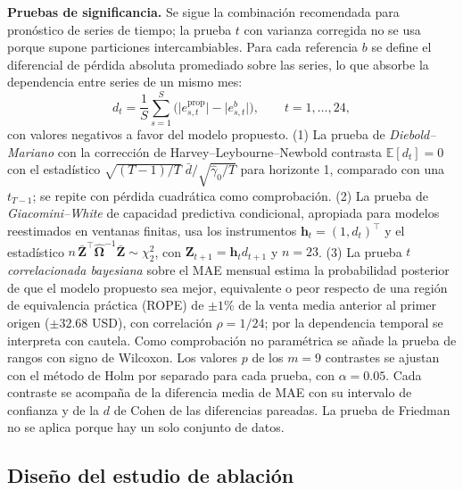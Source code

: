 \documentclass[pdflatex,sn-mathphys-num]{sn-jnl}
\begin{document}
\textbf{Pruebas de significancia.} Se sigue la combinación recomendada para pronóstico de series de tiempo; la prueba $t$ con varianza corregida \cite{nadeau2003} no se usa porque supone particiones intercambiables. Para cada referencia $b$ se define el diferencial de pérdida absoluta promediado sobre las series, lo que absorbe la dependencia entre series de un mismo mes:
\begin{equation}
d_t=\frac{1}{S}\sum_{s=1}^{S}\bigl(\lvert e^{\mathrm{prop}}_{s,t}\rvert-\lvert e^{b}_{s,t}\rvert\bigr),\qquad t=1,\dots,24,
\label{eq:dt}
\end{equation}
con valores negativos a favor del modelo propuesto. (1) La prueba de \emph{Diebold--Mariano} \cite{diebold1995} con la corrección de Harvey--Leybourne--Newbold \cite{harvey1997} contrasta $\mathbb{E}[d_t]=0$ con el estadístico $\sqrt{(T-1)/T}\;\bar{d}/\sqrt{\hat{\gamma}_0/T}$ para horizonte 1, comparado con una $t_{T-1}$; se repite con pérdida cuadrática como comprobación. (2) La prueba de \emph{Giacomini--White} \cite{giacomini2006} de capacidad predictiva condicional, apropiada para modelos reestimados en ventanas finitas, usa los instrumentos $\mathbf{h}_t=(1,d_t)^{\top}$ y el estadístico $n\,\bar{\mathbf{Z}}^{\top}\hat{\boldsymbol{\Omega}}^{-1}\bar{\mathbf{Z}}\sim\chi^2_2$, con $\mathbf{Z}_{t+1}=\mathbf{h}_t d_{t+1}$ y $n=23$. (3) La prueba $t$ \emph{correlacionada bayesiana} \cite{corani2015,benavoli2017} sobre el MAE mensual estima la probabilidad posterior de que el modelo propuesto sea mejor, equivalente o peor respecto de una región de equivalencia práctica (ROPE) de $\pm1$\% de la venta media anterior al primer origen ($\pm32.68$ USD), con correlación $\rho=1/24$; por la dependencia temporal se interpreta con cautela. Como comprobación no paramétrica se añade la prueba de rangos con signo de Wilcoxon. Los valores $p$ de los $m=9$ contrastes se ajustan con el método de Holm \cite{holm1979} por separado para cada prueba, con $\alpha=0.05$. Cada contraste se acompaña de la diferencia media de MAE con su intervalo de confianza y de la $d$ de Cohen de las diferencias pareadas. La prueba de Friedman no se aplica porque hay un solo conjunto de datos.

\subsection{Diseño del estudio de ablación}\label{subsec:ablacion}
\end{document}
